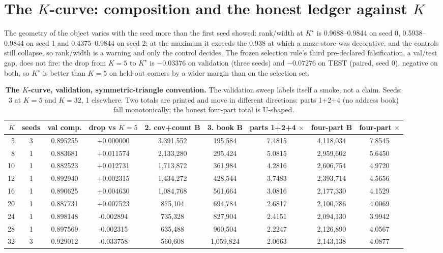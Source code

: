 \documentclass{article}
\newcommand{\Kstar}{\ensuremath{K^{\star}}}
\begin{document}
\section{The $K$-curve: composition and the honest ledger against $K$}
\label{app:kcurve}

The geometry of the object varies with the seed more than the first seed showed:
rank/width at $\Kstar$ is 0.9688--0.9844 on seed 0, 0.5938--0.9844 on seed 1 and
0.4375--0.9844 on seed 2; at the maximum it exceeds the 0.938 at which a maze store was
decorative, and the controls still collapse, so rank/width is a warning and only the control
decides.
The frozen selection rule's third pre-declared falsification, a val/test gap, does not fire:
the drop from $K=5$ to $\Kstar$ is $-0.03376$ on validation (three seeds) and $-0.07276$ on
TEST (paired, seed 0), negative on both, so $\Kstar$ is better than $K=5$ on held-out corners
by a wider margin than on the selection set.


\begin{table}[h]
\centering\small
\caption{\textbf{The $K$-curve, validation, symmetric-triangle convention.} The validation sweep
labels itself a smoke, not a claim. Seeds: 3 at $K=5$ and $K=32$, 1 elsewhere. Two totals are
printed and move in different directions: parts 1+2+4 (no address book) fall monotonically; the
honest four-part total is U-shaped.}
\label{tab:kcurve}
\setlength{\tabcolsep}{2.4pt}
\begin{adjustbox}{max width=\linewidth}\begin{tabular}{rcccccccc}
\toprule
$K$ & seeds & val comp. & drop vs $K{=}5$ & 2. cov+count B & 3. book B & parts 1+2+4 $\times$ & four-part B & four-part $\times$ \\
\midrule
5 & 3 & 0.895255 & +0.000000 & 3,391,552 & 195,584 & 7.4815 & 4,118,034 & 7.8545 \\
8 & 1 & 0.883681 & +0.011574 & 2,133,280 & 295,424 & 5.0815 & 2,959,602 & 5.6450 \\
10 & 1 & 0.882523 & +0.012731 & 1,713,872 & 361,984 & 4.2816 & 2,606,754 & 4.9720 \\
12 & 1 & 0.892940 & +0.002315 & 1,434,272 & 428,544 & 3.7483 & 2,393,714 & 4.5656 \\
16 & 1 & 0.890625 & +0.004630 & 1,084,768 & 561,664 & 3.0816 & 2,177,330 & 4.1529 \\
20 & 1 & 0.887731 & +0.007523 & 875,104 & 694,784 & 2.6817 & 2,100,786 & 4.0069 \\
24 & 1 & 0.898148 & -0.002894 & 735,328 & 827,904 & 2.4151 & 2,094,130 & 3.9942 \\
28 & 1 & 0.897569 & -0.002315 & 635,488 & 960,504 & 2.2247 & 2,126,890 & 4.0567 \\
32 & 3 & 0.929012 & -0.033758 & 560,608 & 1,059,824 & 2.0663 & 2,143,138 & 4.0877 \\
\bottomrule
\end{tabular}\end{adjustbox}
\end{table}
\end{document}
